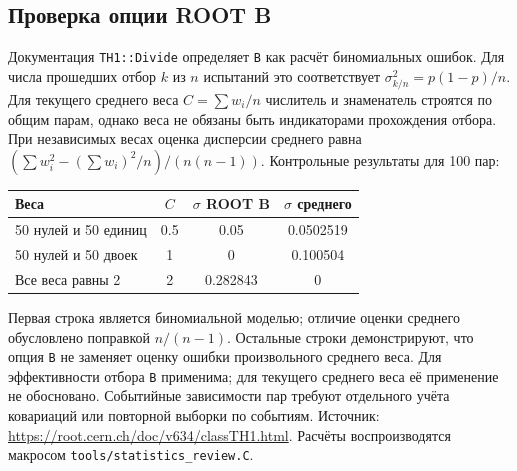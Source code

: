 \subsection*{Проверка опции ROOT B}
Документация \texttt{TH1::Divide} определяет \texttt{B} как расчёт
биномиальных ошибок. Для числа прошедших отбор $k$ из $n$ испытаний
это соответствует $\sigma_{k/n}^2=p(1-p)/n$.
Для текущего среднего веса $C=\sum w_i/n$ числитель и знаменатель
строятся по общим парам, однако веса не обязаны быть индикаторами
прохождения отбора. При независимых весах оценка дисперсии среднего
равна $(\sum w_i^2-(\sum w_i)^2/n)/(n(n-1))$.
Контрольные результаты для 100 пар:
\begin{center}
\begin{tabular}{l|c|c|c}
Веса & $C$ & $\sigma$ ROOT B & $\sigma$ среднего\\ \hline
50 нулей и 50 единиц & 0.5 & 0.05 & 0.0502519\\
50 нулей и 50 двоек & 1 & 0 & 0.100504\\
Все веса равны 2 & 2 & 0.282843 & 0
\end{tabular}
\end{center}
Первая строка является биномиальной моделью; отличие оценки среднего
обусловлено поправкой $n/(n-1)$. Остальные строки демонстрируют,
что опция \texttt{B} не заменяет оценку ошибки произвольного среднего веса.
Для эффективности отбора \texttt{B} применима; для текущего среднего
веса её применение не обосновано. Событийные зависимости пар требуют
отдельного учёта ковариаций или повторной выборки по событиям.
Источник: \url{https://root.cern.ch/doc/v634/classTH1.html}.
Расчёты воспроизводятся макросом \texttt{tools/statistics\_review.C}.
